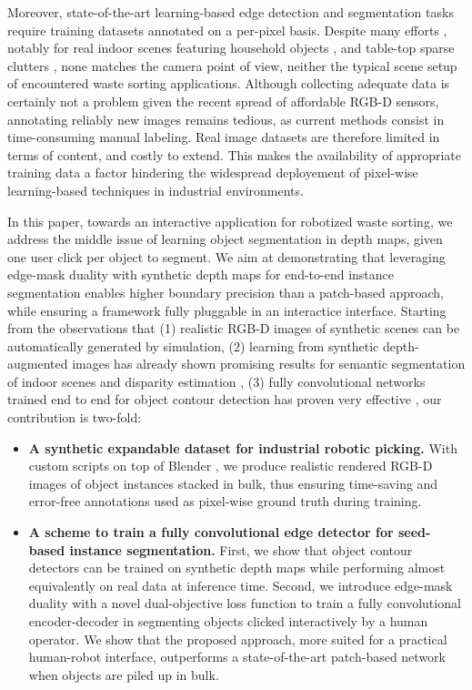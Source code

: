 \documentclass[runningheads,a4paper]{llncs}
\begin{document}
Moreover, state-of-the-art learning-based edge detection and segmentation tasks require training datasets annotated on a per-pixel basis. Despite many efforts \cite{Firman_2016_CVPR_Workshops}, notably for real indoor scenes featuring household objects \cite{SilbermanECCV12, LaiBRF11}, and table-top sparse clutters \cite{RichtsfeldMPZV12}, none matches the camera point of view, neither the typical scene setup of encountered waste sorting applications. Although collecting adequate data is certainly not a problem given the recent spread of affordable RGB-D sensors, annotating reliably new images remains tedious, as current methods consist in time-consuming manual labeling. Real image datasets are therefore limited in terms of content, and costly to extend. This makes the availability of appropriate training data a factor hindering the widespread deployement of pixel-wise learning-based techniques in industrial environments.

In this paper, towards an interactive application for robotized waste sorting, we address the middle issue of learning object segmentation in depth maps, given one user click per object to segment. We aim at demonstrating that leveraging edge-mask duality with synthetic depth maps for end-to-end instance segmentation enables higher boundary precision than a patch-based approach, while ensuring a framework fully pluggable in an interactice interface. Starting from the observations that (1) realistic RGB-D images of synthetic scenes can be automatically generated by simulation, (2) learning from synthetic depth-augmented images has already shown promising results for semantic segmentation of indoor scenes \cite{Handa_2016_CVPR} and disparity estimation \cite{Mayer_2016_CVPR}, (3) fully convolutional networks trained end to end for object contour detection has proven very effective \cite{Yang2016CEDN}, our contribution is two-fold:

\begin{itemize}
\item \textbf{A synthetic expandable dataset for industrial robotic picking.} With custom scripts on top of Blender \cite{Blender}, we produce realistic rendered RGB-D images of object instances stacked in bulk, thus ensuring time-saving and error-free annotations used as pixel-wise ground truth during training.

\item \textbf{A scheme to train a fully convolutional edge detector for seed-based instance segmentation.} First, we show that object contour detectors can be trained on synthetic depth maps while performing almost equivalently on real data at inference time. Second, we introduce edge-mask duality with a novel dual-objective loss function to train a fully convolutional encoder-decoder in segmenting objects clicked interactively by a human operator. We show that the proposed approach, more suited for a practical human-robot interface, outperforms a state-of-the-art patch-based network when objects are piled up in bulk.
\end{itemize}
\end{document}
